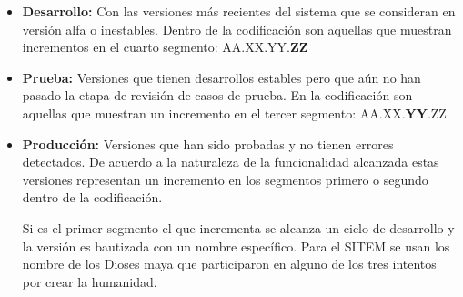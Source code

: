 \begin{itemize}
\item \textbf{Desarrollo:} Con las versiones más recientes del sistema que se consideran en versión alfa o inestables. Dentro de la codificación son aquellas que muestran incrementos en el cuarto segmento: AA.XX.YY.\textbf{ZZ}
\item \textbf{Prueba:} Versiones que tienen desarrollos estables pero que aún no han pasado la etapa de revisión de casos de prueba. En la codificación son aquellas que muestran un incremento en el tercer segmento: AA.XX.\textbf{YY}.ZZ 
\item \textbf{Producción:} Versiones que han sido probadas y no tienen errores detectados. De acuerdo a la naturaleza de la funcionalidad alcanzada estas versiones representan un incremento en los segmentos primero o segundo dentro de la codificación. 

Si es el primer segmento el que incrementa se alcanza un ciclo de desarrollo y la versión es bautizada con un nombre específico. Para el SITEM se usan los nombre de los Dioses maya que participaron en alguno de los tres intentos por crear la humanidad.
\end{itemize}
